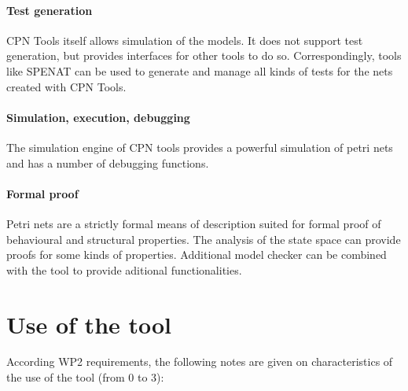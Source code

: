 \paragraph{Test generation}
CPN Tools itself allows simulation of the models. It does not support test generation, but provides interfaces for other tools to do so. Correspondingly, tools like SPENAT can be used to generate and manage all kinds of tests for the nets created with CPN Tools.

\paragraph{Simulation, execution, debugging}
The simulation engine of CPN tools provides a powerful simulation of petri nets and has a number of debugging functions.

\paragraph{Formal proof}
Petri nets are a strictly formal means of description suited for formal proof of behavioural and structural properties. The analysis of the state space can provide proofs for some kinds of properties. Additional model checker can be combined with the tool to provide aditional functionalities.



\section{Use of the tool}


According WP2 requirements, the following notes are given on characteristics of the use of the tool (from 0 to 3):

